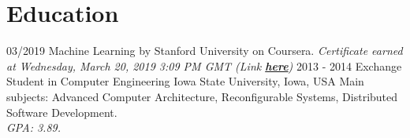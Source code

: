 \documentclass[]{friggeri-cv}
\begin{document}
\section{Education}
  \begin{entrylist}
  \entry
    {03/2019}
    {Machine Learning by Stanford University on Coursera.}
    {}
    {\emph{Certificate earned at Wednesday, March 20, 2019 3:09 PM GMT (Link \href{https://www.coursera.org/account/accomplishments/certificate/XAWSYCH46GSE}{\textbf{here}})}}
  \entry
    {2013 - 2014}
    {Exchange Student in Computer Engineering}
    {Iowa State University, Iowa, USA}
    {Main subjects: Advanced Computer Architecture, Reconfigurable Systems, Distributed Software Development.\\
    \emph{GPA: 3.89.}\\}
\end{entrylist}
\end{document}
